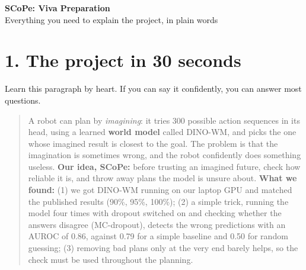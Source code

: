 \documentclass[11pt,a4paper]{article}
\begin{document}
\begin{center}
{\LARGE\bfseries SCoPe: Viva Preparation}\\[4pt]
{\large Everything you need to explain the project, in plain words}
\end{center}

\section*{1. The project in 30 seconds}
Learn this paragraph by heart. If you can say it confidently, you can answer most questions.

\begin{quote}
A robot can plan by \emph{imagining}: it tries 300 possible action sequences in its head, using a learned
\textbf{world model} called DINO-WM, and picks the one whose imagined result is closest to the goal. The problem is that
the imagination is sometimes wrong, and the robot confidently does something useless. \textbf{Our idea, SCoPe:} before
trusting an imagined future, check how reliable it is, and throw away plans the model is unsure about.
\textbf{What we found:} (1) we got DINO-WM running on our laptop GPU and matched the published results (90\%, 95\%,
100\%); (2) a simple trick, running the model four times with dropout switched on and checking whether the answers
disagree (MC-dropout), detects the wrong predictions with an AUROC of 0.86, against 0.79 for a simple baseline and 0.50
for random guessing; (3) removing bad plans only at the very end barely helps, so the check must be used throughout the
planning.
\end{quote}
\end{document}
